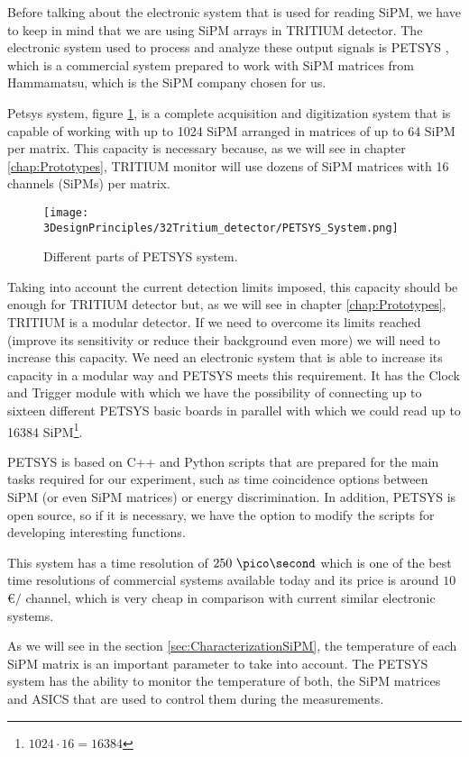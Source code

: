 Before talking about the electronic system that is used for reading SiPM, we have to keep in mind that we are using SiPM arrays in TRITIUM detector. The electronic system used to process and analyze these output signals is PETSYS \cite{PETSYS}, which is a commercial system prepared to work with SiPM matrices from Hammamatsu, which is the SiPM company chosen for us.

Petsys system, figure \ref{fig:PETSYS}, is a complete acquisition and digitization system that is capable of working with up to 1024 SiPM arranged in matrices of up to 64 SiPM per matrix. This capacity is necessary because, as we will see in chapter \ref{chap:Prototypes}, TRITIUM monitor will use dozens of SiPM matrices with 16 channels (SiPMs) per matrix.


\begin{figure}[htbp]
\centering
\texttt{[image: 3DesignPrinciples/32Tritium\_detector/PETSYS\_System.png]}
\caption{Different parts of PETSYS system.\label{fig:PETSYS}~\cite{PETSYS}}
\end{figure}

Taking into account the current detection limits imposed, this capacity should be enough for TRITIUM detector but, as we will see in chapter \ref{chap:Prototypes}, TRITIUM is a modular detector. If we need to overcome its limits reached (improve its sensitivity or reduce their background even more) we will need to increase this capacity. We need an electronic system that is able to increase its capacity in a modular way and PETSYS meets this requirement. It has the Clock and Trigger module with which we have the possibility of connecting up to sixteen different PETSYS basic boards in parallel with which we could read up to 16384 SiPM\footnote{$1024\cdot{}16 = 16384$}.

PETSYS is based on C++ and Python scripts that are prepared for the main tasks required for our experiment, such as time coincidence options between SiPM (or even SiPM matrices) or energy discrimination. In addition, PETSYS is open source, so if it is necessary, we have the option to modify the scripts for developing interesting functions.

This system has a time resolution of $250~\pico\second$ which is one of the best time resolutions of commercial systems available today and its price is around $10$\euro$/$ channel, which is very cheap in comparison with current similar electronic systems.

As we will see in the section \ref{sec:CharacterizationSiPM}, the temperature of each SiPM matrix is an important parameter to take into account. The PETSYS system has the ability to monitor the temperature of both, the SiPM matrices and ASICS that are used to control them during the measurements.

